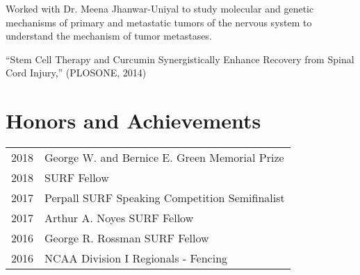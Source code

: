 \documentclass[letterpaper]{deedy-resume} %
\begin{document}
\begin{minipage}[t]{0.58\textwidth}
\sectionspace


\begin{tightitemize}
\item Worked with Dr. Meena Jhanwar-Uniyal to study molecular and genetic mechanisms of primary and metastatic tumors of the nervous system to understand the mechanism of tumor metastases.
\item ``Stem Cell Therapy and Curcumin Synergistically Enhance Recovery from Spinal Cord Injury,'' (PLOSONE, 2014)
\end{tightitemize}

\sectionspace %



\section{Honors and Achievements} 

\begin{tabular}{rl}
	2018	& George W. and Bernice E. Green Memorial Prize\\
	2018 	& SURF Fellow \\
	2017	 & Perpall SURF Speaking Competition Semifinalist \\
	2017	 & Arthur A. Noyes SURF Fellow \\
	2016	 & George R. Rossman SURF Fellow  \\
	2016	 & NCAA Division I Regionals - Fencing\\
\end{tabular}





\end{minipage}
\end{document}
